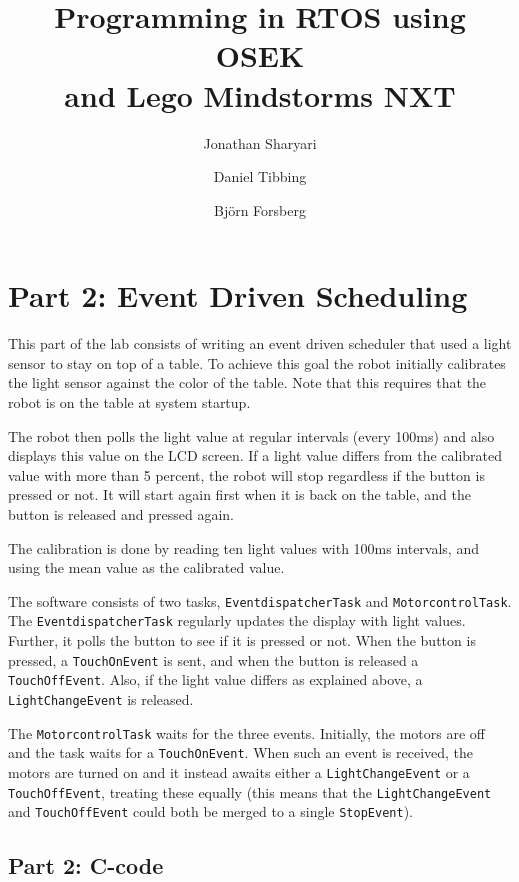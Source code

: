\documentclass[a4paper,10pt]{report}
\title{\textbf{Programming in RTOS using OSEK\\ and Lego Mindstorms NXT}}
\author{Jonathan Sharyari \and Daniel Tibbing \and Bj{\"o}rn Forsberg}
\begin{document}
\maketitle

\section*{Part 2: Event Driven Scheduling}

This part of the lab consists of writing an event driven scheduler that used a light sensor to stay on top of a table. To achieve this goal the robot initially  calibrates the light sensor against the color of the table. Note that this requires that the robot is on the table at system startup. 

The robot then polls the light value at regular intervals (every 100ms) and also displays this value on the LCD screen. If a light value differs from the calibrated value with more than 5 percent, the robot will stop regardless if the button is pressed or not. It will start again first when it is back on the table, and the button is released and pressed again.

The calibration is done by reading ten light values with 100ms intervals, and using the mean value as the calibrated value.

The software consists of two tasks, \texttt{EventdispatcherTask} and \texttt{MotorcontrolTask}. The \texttt{EventdispatcherTask} regularly updates the display with light values. Further, it polls the button to see if it is pressed or not. When the button is pressed, a \texttt{TouchOnEvent} is sent, and when the button is released a \texttt{TouchOffEvent}. Also, if the light value differs as explained above, a \texttt{LightChangeEvent} is released.

The \texttt{MotorcontrolTask} waits for the three events. Initially, the motors are off and the task waits for a \texttt{TouchOnEvent}. When such an event is received, the motors are turned on and it instead awaits either a \texttt{LightChangeEvent} or a \texttt{TouchOffEvent}, treating these equally (this means that the \texttt{LightChangeEvent} and \texttt{TouchOffEvent} could both be merged to a single \texttt{StopEvent}).


\appendix
\subsection*{Part 2: C-code}
\end{document}
